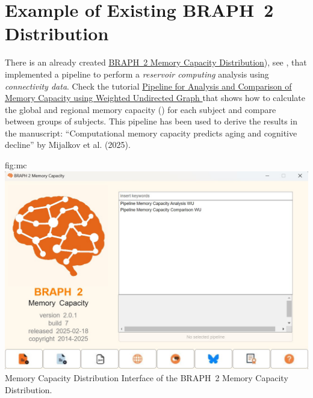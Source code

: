 \documentclass{tufte-handout}
\begin{document}

\clearpage
\section{Example of Existing BRAPH~2 Distribution}

There is an already created \href{https://github.com/braph-software/MemoryCapacity}{BRAPH~2 Memory Capacity Distribution}), see , that implemented a pipeline to perform a \emph{reservoir computing} analysis using \emph{connectivity data}. Check the tutorial \href{https://github.com/braph-software/MemoryCapacity/tree/develop/tutorials/tut_mc_wu}{Pipeline for Analysis and Comparison of Memory Capacity using Weighted Undirected Graph
} that shows how to calculate the global and regional memory capacity () for each subject and compare between groups of subjects. This pipeline has been used to derive the results in the manuscript: “Computational memory capacity predicts aging and cognitive decline” by Mijalkov et al. (2025).

	{fig:mc}
	{\includegraphics{fig08.jpg}}
	{Memory Capacity Distribution}
	{
	Interface of the BRAPH~2 Memory Capacity Distribution.
	}

\end{document}
